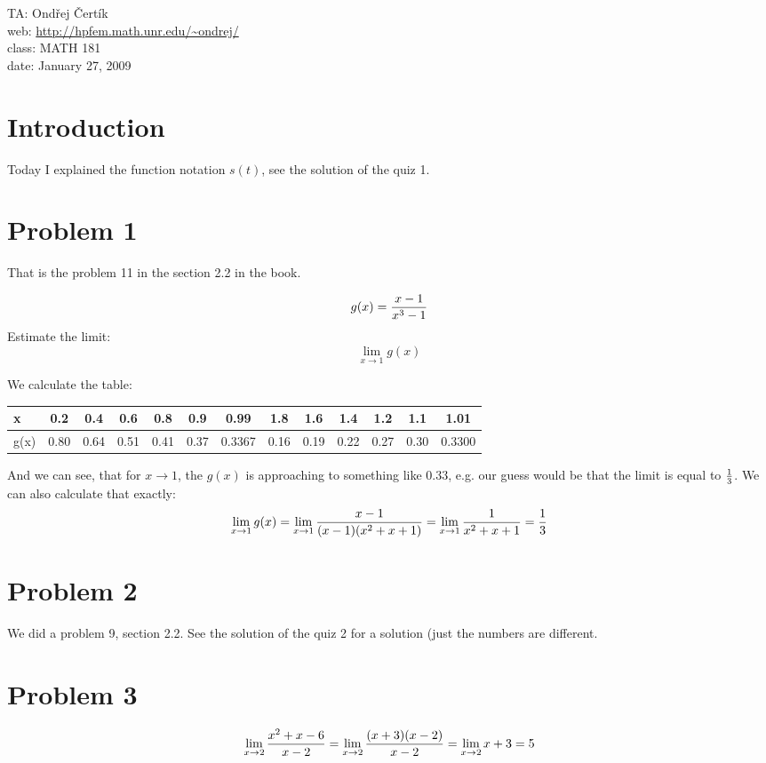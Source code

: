 \documentclass[10pt]{article}
\begin{document}
\noindent TA: Ondřej Čertík\\
web: \url{http://hpfem.math.unr.edu/~ondrej/}\\
class: MATH 181\\
date: January 27, 2009

\section{Introduction}

Today I explained the function notation $s(t)$, see the solution of the quiz 1.

\section{Problem 1}

That is the problem 11 in the section 2.2 in the book.

$$g(x)={x-1\over x^3-1}$$
Estimate the limit:
$$\lim_{x\to1}g(x)$$

We calculate the table:

\begin{tabular}{|l||c|c|c|c|c|c|c|c|c|c|c|c|}
\hline
x & 0.2 & 0.4 & 0.6 & 0.8 & 0.9 & 0.99 & 1.8 & 1.6 & 1.4 & 1.2 & 1.1 & 1.01 \\ \hline
g(x) & 0.80 & 0.64 & 0.51 & 0.41 & 0.37 & 0.3367 & 0.16 & 0.19 & 0.22 & 0.27 & 0.30 & 0.3300\\
\hline
\end{tabular}
And we can see, that for $x\to1$, the $g(x)$ is approaching to something like
$0.33$, e.g. our guess would be that the limit is equal to $1\over 3$. We can
also calculate that exactly:
$$\lim_{x\to1}g(x)=\lim_{x\to1}{x-1\over (x-1)(x^2+x+1)}=\lim_{x\to1}{1\over x^2+x+1}={1\over3}$$

\section{Problem 2}

We did a problem 9, section 2.2. See the solution of the quiz 2 for a solution
(just the numbers are different.

\section{Problem 3}

$$\lim_{x\to2}{x^2+x-6\over x-2}=\lim_{x\to2}{(x+3)(x-2)\over x-2} =
\lim_{x\to2} x+ 3 = 5$$
\end{document}
